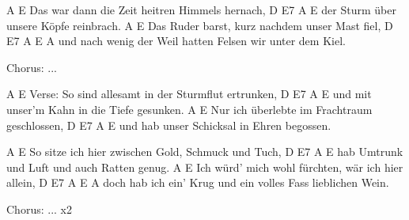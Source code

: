             A                         E
        Das war dann die Zeit heitren Himmels hernach,
            D          E7     A         E
        der Sturm über unsere Köpfe reinbrach.
            A                         E
        Das Ruder barst, kurz nachdem unser Mast fiel,
                 D         E7          A          E         A
        und nach wenig der Weil hatten Felsen wir unter dem Kiel.


Chorus: ...


           A                    E
Verse:  So sind allesamt in der Sturmflut ertrunken,
            D           E7          A       E
        und mit unser'm Kahn in die Tiefe gesunken.
            A                E
        Nur ich überlebte im Frachtraum geschlossen,
            D         E7           A       E
        und hab unser Schicksal in Ehren begossen.


           A                       E
        So sitze ich hier zwischen Gold, Schmuck und Tuch,
            D           E7            A        E
        hab Umtrunk und Luft und auch Ratten genug.
            A                             E
        Ich würd' mich wohl fürchten, wär ich hier allein,
            D      E7          A         E         A
        doch hab ich ein' Krug und ein volles Fass lieblichen Wein.


Chorus: ... x2
